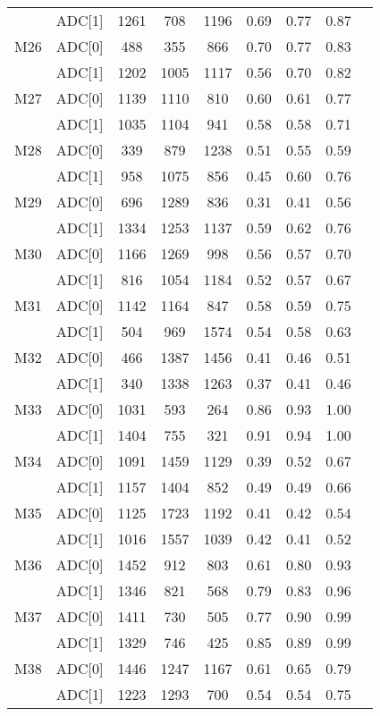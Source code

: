 \begin{longtable}{c c c c c c c c c}
     & ADC[1] & 1261 & 708 & 1196 & 0.69 & 0.77 & 0.87\\
  M26 & ADC[0] & 488 & 355 & 866 & 0.70 & 0.77 & 0.83\\
     & ADC[1] & 1202 & 1005 & 1117 & 0.56 & 0.70 & 0.82\\
  M27 & ADC[0] & 1139 & 1110 & 810 & 0.60 & 0.61 & 0.77\\
     & ADC[1] & 1035 & 1104 & 941 & 0.58 & 0.58 & 0.71\\
  M28 & ADC[0] & 339 & 879 & 1238 & 0.51 & 0.55 & 0.59\\
     & ADC[1] & 958 & 1075 & 856 & 0.45 & 0.60 & 0.76\\
  M29 & ADC[0] & 696 & 1289 & 836 & 0.31 & 0.41 & 0.56\\
     & ADC[1] & 1334 & 1253 & 1137 & 0.59 & 0.62 & 0.76\\
  M30 & ADC[0] & 1166 & 1269 & 998 & 0.56 & 0.57 & 0.70\\
     & ADC[1] & 816 & 1054 & 1184 & 0.52 & 0.57 & 0.67\\
  M31 & ADC[0] & 1142 & 1164 & 847 & 0.58 & 0.59 & 0.75\\
     & ADC[1] & 504 & 969 & 1574 & 0.54 & 0.58 & 0.63\\
  M32 & ADC[0] & 466 & 1387 & 1456 & 0.41 & 0.46 & 0.51\\
     & ADC[1] & 340 & 1338 & 1263 & 0.37 & 0.41 & 0.46\\
  M33 & ADC[0] & 1031 & 593 & 264 & 0.86 & 0.93 & 1.00\\
     & ADC[1] & 1404 & 755 & 321 & 0.91 & 0.94 & 1.00\\
  M34 & ADC[0] & 1091 & 1459 & 1129 & 0.39 & 0.52 & 0.67\\
     & ADC[1] & 1157 & 1404 & 852 & 0.49 & 0.49 & 0.66\\
  M35 & ADC[0] & 1125 & 1723 & 1192 & 0.41 & 0.42 & 0.54\\
     & ADC[1] & 1016 & 1557 & 1039 & 0.42 & 0.41 & 0.52\\
  M36 & ADC[0] & 1452 & 912 & 803 & 0.61 & 0.80 & 0.93\\
     & ADC[1] & 1346 & 821 & 568 & 0.79 & 0.83 & 0.96\\
  M37 & ADC[0] & 1411 & 730 & 505 & 0.77 & 0.90 & 0.99\\
     & ADC[1] & 1329 & 746 & 425 & 0.85 & 0.89 & 0.99\\
  M38 & ADC[0] & 1446 & 1247 & 1167 & 0.61 & 0.65 & 0.79\\
     & ADC[1] & 1223 & 1293 & 700 & 0.54 & 0.54 & 0.75\\

\end{longtable}
